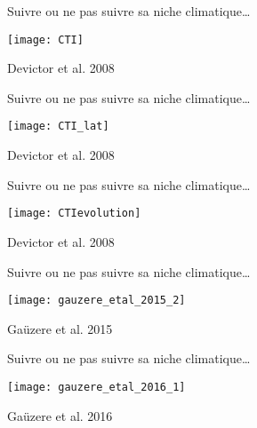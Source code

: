 \documentclass[10pt]{beamer}
\begin{document}
\begin{frame}{Suivre ou ne pas suivre sa niche climatique…}
 \begin{center}
   \texttt{[image: CTI]}
 \end{center}

 \begin{tiny}
    Devictor et al. 2008
  \end{tiny}
\end{frame}

\begin{frame}{Suivre ou ne pas suivre sa niche climatique…}
  \begin{center}
   \texttt{[image: CTI\_lat]}
  \end{center}

  \begin{tiny}
    Devictor et al. 2008
  \end{tiny}
\end{frame}

\begin{frame}{Suivre ou ne pas suivre sa niche climatique…}
  \begin{center}
   \texttt{[image: CTIevolution]}
  \end{center}

  \begin{tiny}
    Devictor et al. 2008
  \end{tiny}
\end{frame}



\begin{frame}{Suivre ou ne pas suivre sa niche climatique…}
  \begin{center}
         \texttt{[image: gauzere\_etal\_2015\_2]}
  \end{center}

  \begin{tiny}
    Gaüzere et al. 2015
  \end{tiny}
\end{frame}

\begin{frame}{Suivre ou ne pas suivre sa niche climatique…}
  \begin{center}
   \texttt{[image: gauzere\_etal\_2016\_1]}

  \end{center}

  \begin{tiny}
    Gaüzere et al. 2016
  \end{tiny}
\end{frame}
\end{document}
